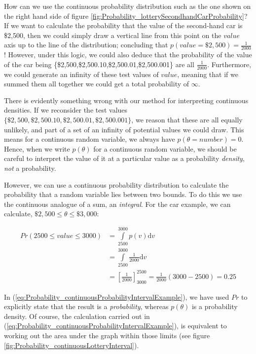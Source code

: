 \documentclass[11pt,fullpage]{book}
\begin{document}
How can we use the continuous probability distribution such as the one shown on the right hand side of figure \ref{fig:Probability_lotterySecondhandCarProbability}? If we want to calculate the probability that the value of the second-hand car is \$2,500, then we could simply draw a vertical line from this point on the $value$ axis up to the line of the distribution; concluding that $p(value=\$2,500) = \frac{1}{2000}$! However, under this logic, we could also deduce that the probability of the value of the car being \{\$2,500,\$2,500.10,\$2,500.01,\$2,500.001\} are all $\frac{1}{2000}$. Furthermore, we could generate an infinity of these test values of $value$, meaning that if we summed them all together we could get a total probability of $\infty$. 

There is evidently something wrong with our method for interpreting continuous densities. If we reconsider the test values $\{\$2,500,\$2,500.10,\$2,500.01,\$2,500.001\}$, we reason that these are all equally unlikely, and part of a set of an infinity of potential values we could draw. This means for a continuous random variable, we always have $p(\theta=number) = 0$. Hence, when we write $p(\theta)$ for a continuous random variable, we should be careful to interpret the value of it at a particular value as a probability \textit{density}, \textit{not} a probability. 

However, we can use a continuous probability distribution to calculate the probability that a random variable lies between two bounds. To do this we use the continuous analogue of a sum, an \textit{integral}. For the car example, we can calculate, $\$2,500\leq \theta \leq \$3,000$:

\begin{equation}\label{eq:Probability_continuousProbabilityIntervalExample}
\begin{align}
Pr(2500\leq value \leq 3000) &= \int\limits_{2500}^{3000} p(v) \mathrm{d}v\\
&= \int\limits_{2500}^{3000} \frac{1}{2000} \mathrm{d}v\\
&= \left[\frac{1}{2000}\right]^{2500}_{3000} = \frac{1}{2000}(3000-2500) = 0.25
\end{align}
\end{equation}

In (\ref{eq:Probability_continuousProbabilityIntervalExample}), we have used $Pr$ to explicitly state that the result is a \textit{probability}, whereas $p(\theta)$ is a probability density. Of course, the calculation carried out in (\ref{eq:Probability_continuousProbabilityIntervalExample}), is equivalent to working out the area under the graph within those limits (see figure \ref{fig:Probability_continuousLotteryInterval}).
\end{document}
